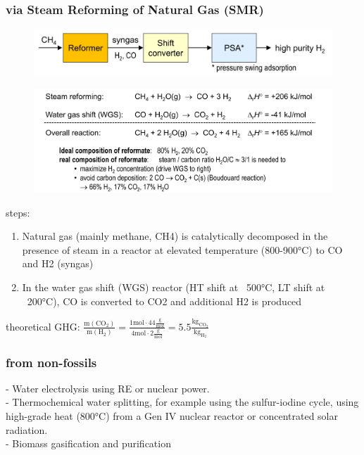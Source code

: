 \documentclass[a4paper,10pt,landscape]{scrartcl}
\begin{document}
\begin{multicols*}{3}
\subsubsection{via Steam Reforming of Natural Gas (SMR)}
\begin{figure}[H]
    \centering
    \includegraphics[width=1\linewidth]{src/PSA.png}
\end{figure}
\vspace{-1cm}
\begin{figure}[H]
    \centering
    \includegraphics[width=1\linewidth]{src/h2_steam.png}
\end{figure}
steps:
\begin{enumerate}
    \item Natural gas (mainly methane, CH4) is catalytically decomposed in the presence of steam in a reactor at elevated
temperature (800-900°C) to CO and H2 (syngas)
    \item In the water gas shift (WGS) reactor (HT shift at ~500°C, LT shift at ~200°C), CO is converted to CO2 and
additional H2 is produced
\end{enumerate}
theoretical GHG: $\mathrm{\frac{m(CO_2)}{m(H_2)}=\frac{1mol\cdot 44\frac{g}{mol}}{4mol\cdot 2\frac{g}{mol}}}=5.5 \mathrm{\frac{kg_{CO_2}}{kg_{H_2}}}$

\subsubsection{from non-fossils}
- Water electrolysis using RE or nuclear power. \\
- Thermochemical water splitting, for example using the sulfur-iodine cycle, using high-grade heat (800°C) from a Gen IV nuclear reactor or concentrated solar radiation. \\
- Biomass gasification and purification 


\end{multicols*}
\end{document}
